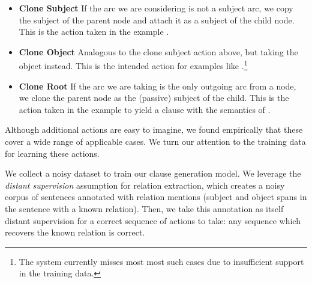 \vspace{-1ex}
\begin{itemize}[leftmargin=2ex]
\item[] \textbf{Clone Subject}  \hspace{1ex}
  If the arc we are considering is not a subject arc,
    we copy the subject of the parent node and attach it as a subject of the
    child node.
  This is the action taken in the example
    .

\item[] \textbf{Clone Object}  \hspace{1ex}
  Analogous to the clone subject action above, but taking the object
    instead.
  This is the intended action for examples like
    .\footnote{
      The system currently misses most most such cases due to insufficient 
      support in the training data.
    }

\item[] \textbf{Clone Root} \hspace{1ex}
  If the arc we are taking is the only outgoing arc from a node, we clone the
    parent node as the (passive) subject of the child.
  This is the action taken in the example
     to yield a clause with the
    semantics of .
\end{itemize}

Although additional actions are easy to imagine, we found empirically that
  these cover a wide range of applicable cases.
We turn our attention to the training data for learning these actions.

%
%
We collect a noisy dataset to train our clause generation model.
We leverage the \textit{distant supervision} assumption for relation extraction,
  which creates a noisy corpus of sentences annotated with relation mentions
  (subject and object spans in the sentence with a known relation).
Then, we take this annotation as itself distant supervision for a correct
  sequence of actions to take: any sequence which recovers the 
  known relation is correct.

